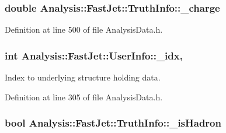 \subsubsection[{\texorpdfstring{\+\_\+charge}{_charge}}]{\setlength{\rightskip}{0pt plus 5cm}double Analysis\+::\+Fast\+Jet\+::\+Truth\+Info\+::\+\_\+charge\hspace{0.3cm}{\ttfamily [protected]}}\hypertarget{classAnalysis_1_1FastJet_1_1TruthInfo_a44a9ca75492ca6e4e788e559f9afb1e7}{}\label{classAnalysis_1_1FastJet_1_1TruthInfo_a44a9ca75492ca6e4e788e559f9afb1e7}


Definition at line 500 of file Analysis\+Data.\+h.

\subsubsection[{\texorpdfstring{\+\_\+idx}{_idx}}]{\setlength{\rightskip}{0pt plus 5cm}int Analysis\+::\+Fast\+Jet\+::\+User\+Info\+::\+\_\+idx\hspace{0.3cm}{\ttfamily [protected]}, {\ttfamily [inherited]}}\hypertarget{classAnalysis_1_1FastJet_1_1UserInfo_ad9aa33e317aea2b675493b664cc718a3}{}\label{classAnalysis_1_1FastJet_1_1UserInfo_ad9aa33e317aea2b675493b664cc718a3}


Index to underlying structure holding data. 



Definition at line 305 of file Analysis\+Data.\+h.

\subsubsection[{\texorpdfstring{\+\_\+is\+Hadron}{_isHadron}}]{\setlength{\rightskip}{0pt plus 5cm}bool Analysis\+::\+Fast\+Jet\+::\+Truth\+Info\+::\+\_\+is\+Hadron\hspace{0.3cm}{\ttfamily [protected]}}\hypertarget{classAnalysis_1_1FastJet_1_1TruthInfo_a3a86cf67d7da9be46ccd842723a75bcb}{}\label{classAnalysis_1_1FastJet_1_1TruthInfo_a3a86cf67d7da9be46ccd842723a75bcb}


